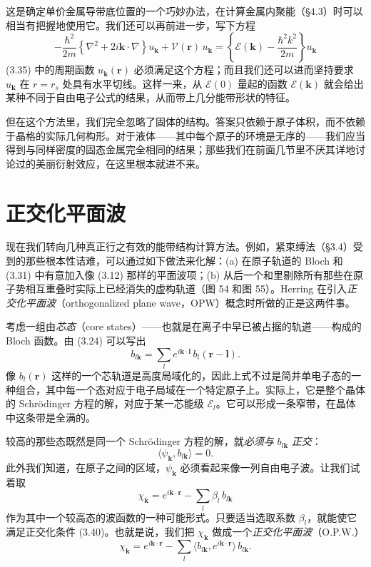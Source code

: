 这是确定单价金属导带底位置的一个巧妙办法，在计算金属内聚能（§4.3）时可以相当有把握地使用它。我们还可以再前进一步，写下方程
\begin{equation*}
-\frac{\hbar^2}{2m}\left\{\nabla^2+2i\mathbf{k}\cdot\nabla\right\}u_{\mathbf{k}}+\mathcal{V}(\mathbf{r})\,u_{\mathbf{k}}
=\left\{\mathcal{E}(\mathbf{k})-\frac{\hbar^2 k^2}{2m}\right\}u_{\mathbf{k}}\tag{3.38}
\end{equation*}
(3.35) 中的周期函数 $u_{\mathbf{k}}(\mathbf{r})$ 必须满足这个方程；而且我们还可以进而坚持要求 $u_{\mathbf{k}}$ 在 $r=r_s$ 处具有水平切线。这样一来，从 $\mathcal{E}(0)$ 量起的函数 $\mathcal{E}(\mathbf{k})$ 就会给出某种不同于自由电子公式的结果，从而带上几分能带形状的特征。

但在这个方法里，我们完全忽略了固体的结构。答案只依赖于原子体积，而不依赖于晶格的实际几何构形。对于液体——其中每个原子的环境是无序的——我们应当得到与同样密度的固态金属完全相同的结果；那些我们在前面几节里不厌其详地讨论过的美丽衍射效应，在这里根本就进不来。

\section{正交化平面波}

现在我们转向几种真正行之有效的能带结构计算方法。例如，紧束缚法（§3.4）受到的那些根本性诘难，可以通过如下做法来化解：(a) 在原子轨道的 Bloch 和 (3.31) 中有意加入像 (3.12) 那样的平面波项；(b) 从后一个和里剔除所有那些在原子势相互重叠时实际上已经消失的虚构轨道（图 54 和图 55）。Herring 在引入\emph{正交化平面波}（orthogonalized plane wave，OPW）概念时所做的正是这两件事。

考虑一组由\emph{芯态}（core states）——也就是在离子中早已被占据的轨道——构成的 Bloch 函数。由 (3.24) 可以写出
\begin{equation*}
b_{l\mathbf{k}}=\sum_l e^{i\mathbf{k}\cdot\mathbf{l}}\,b_l(\mathbf{r}-\mathbf{l}).\tag{3.39}
\end{equation*}
像 $b_l(\mathbf{r})$ 这样的一个芯轨道是高度局域化的，因此上式不过是简并单电子态的一种组合，其中每一个态对应于电子局域在一个特定原子上。实际上，它是整个晶体的 Schrödinger 方程的解，对应于某一芯能级 $\mathcal{E}_l$。它可以形成一条窄带，在晶体中这条带是全满的。

较高的那些态既然是同一个 Schrödinger 方程的解，就\emph{必须与} $b_{l\mathbf{k}}$ \emph{正交}：
\begin{equation*}
\langle\psi_{\mathbf{k}},b_{l\mathbf{k}}\rangle=0.\tag{3.40}
\end{equation*}
此外我们知道，在原子之间的区域，$\psi_{\mathbf{k}}$ 必须看起来像一列自由电子波。让我们试着取
\begin{equation*}
\chi_{\mathbf{k}}=e^{i\mathbf{k}\cdot\mathbf{r}}-\sum_l\beta_l\,b_{l\mathbf{k}}\tag{3.41}
\end{equation*}
作为其中一个较高态的波函数的一种可能形式。只要适当选取系数 $\beta_l$，就能使它满足正交化条件 (3.40)。也就是说，我们把 $\chi_{\mathbf{k}}$ 做成一个\emph{正交化平面波}（O.P.W.）
\begin{equation*}
\chi_{\mathbf{k}}=e^{i\mathbf{k}\cdot\mathbf{r}}-\sum_l\langle b_{l\mathbf{k}},e^{i\mathbf{k}\cdot\mathbf{r}}\rangle\,b_{l\mathbf{k}}.\tag{3.42}
\end{equation*}

